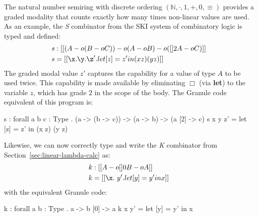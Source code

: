 \begin{example}
\label{ex:s-comb}
  The natural number semiring with discrete ordering $(\mathbb{N}, \cdot, 1, +,
  0, \equiv)$ provides a graded modality that counts exactly how many times
  non-linear values are used. As an example, the \emph{S} combinator from
  the SKI system of combinatory logic is typed and defined:
\begin{align*}
s & : [[ (A -o (B -o C)) -o {(A -o B) -o ({[] 2 A} -o C)} ]] \\
s & = [[ \x . {\y . {\z' . {let [ z ] = z' in {(x z) (y z)}}}} ]]
\end{align*}
The graded modal value $z'$ captures the capability for a value
of type $A$ to be used twice. This capability is made available by eliminating
$\Box$ (via \textbf{let}) to the variable $z$, which has
grade $2$ in the scope of the body. 
The Granule code equivalent of this program is:
\begin{granule}
s : forall { a b c : Type } 
  . (a -> (b -> c)) -> (a -> b) -> (a [2] -> c)
s x y z' = let [z] = z' in (x z) (y z)
\end{granule}
Likewise, we can now correctly type and write the \emph{K} combinator from
Section~\ref{sec:linear-lambda-calc} as:
\begin{align*}
k & : [[ {A -o [] 0 B} -o A ]] \\
k & = [[ \x . \ y' . {let [ y ] = y' in x }]]
\end{align*}
with the equivalent Granule code:
\begin{granule}
k : forall { a b : Type } . a -> b [0] -> a
k x y' = let [y] = y' in x
\end{granule}
\end{example}
